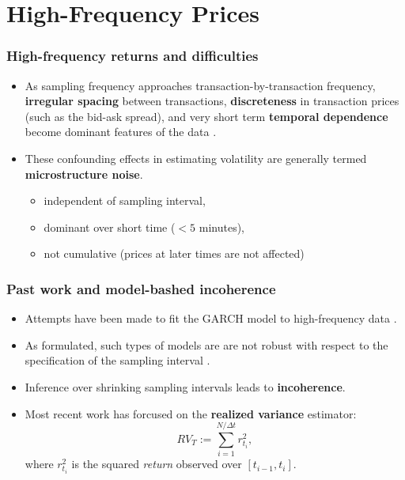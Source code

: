 \documentclass{beamer}
\begin{document}
\section{High-Frequency Prices}
\begin{frame}
  \frametitle{High-frequency returns and difficulties}
  \begin{itemize}
  \item As sampling frequency approaches transaction-by-transaction
    frequency, \textbf{irregular spacing} between transactions, \textbf{discreteness} in
    transaction prices (such as the bid-ask spread), and very short term \textbf{temporal dependence} become
    dominant features of the data \citep{stoll2000presidential}.

  \item These confounding effects in estimating volatility are
    generally termed \textbf{microstructure noise}.

    \begin{itemize}
    \item independent of sampling interval,
    \item dominant over short time ($<5$ minutes),
    \item not cumulative (prices at later times are not affected)
    \end{itemize}

  \end{itemize}
\end{frame}
\begin{frame}
  \frametitle{Past work and model-bashed incoherence}
  \begin{itemize}
  \item Attempts have been made to fit the GARCH model to
    high-frequency data \citep{bollerslev1986,andersen1997intraday}.

  \item As formulated, such types of models are are not
    robust with respect to the specification of the sampling interval
    \citep{drost1993aggregation, andersen1997intraday,
      zumbach2000pitfalls}.

  \item Inference over shrinking sampling intervals leads to
    \textbf{incoherence}.

  \item Most recent work has forcused on the \textbf{realized variance} estimator:
    \[
      RV_T := \sum_{i=1}^{N/\Delta t} r_{t_i}^2,
    \]
    where $r_{t_i}^2$ is the squared \textit{return} observed over $[t_{i-1}, t_i]$.
  \end{itemize}
\end{frame}
\end{document}
